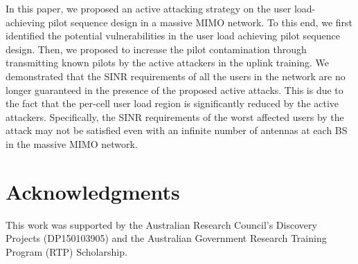 \documentclass[conference]{IEEEtran}
\begin{document}
In this paper, we proposed an active attacking strategy on the user load-achieving pilot sequence design in a massive MIMO network. To this end, we first identified the potential vulnerabilities in the user load achieving pilot sequence design. Then, we proposed to increase the pilot contamination through transmitting known pilots by the active attackers in the uplink training. We demonstrated that the SINR requirements of all the users in the network are no longer guaranteed in the presence of the proposed active attacks. This is due to the fact that the per-cell user load region is significantly reduced by the active attackers. Specifically, the SINR requirements of the worst affected users by the attack may not be satisfied even with an infinite number of antennas at each BS in the massive MIMO network.

\section*{Acknowledgments}

This work was supported by the Australian Research Council's Discovery Projects (DP150103905) and the Australian Government Research Training Program (RTP) Scholarship.
\end{document}
